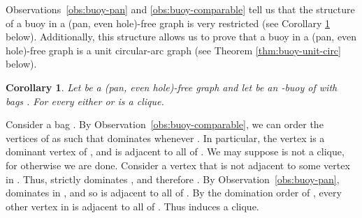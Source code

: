 \documentclass[11pt,a4paper]{article}
\newtheorem{corollary}[theorem]{Corollary}
\newenvironment{proof}{\noindent {\it Proof:~}}{\hfill \smallskip\par}
\begin{document}
Observations~\ref{obs:buoy-pan} and \ref{obs:buoy-comparable} tell
us that the structure of a buoy in a (pan, even hole)-free graph
is very restricted (see Corollary \ref{cor:buoy-clique} below).
Additionally, this structure allows us to prove that a buoy in a
(pan, even hole)-free graph is a unit circular-arc graph (see
Theorem \ref{thm:buoy-unit-circ} below).
\begin{corollary}\label{cor:buoy-clique}
Let  be a (pan, even hole)-free graph and let  be an
-buoy of  with bags . For every
 either  or  is a clique.
\end{corollary}
\begin{proof}
Consider a bag .  By Observation~\ref{obs:buoy-comparable},
we can order the vertices of  as  such that  dominates  whenever .
In particular, the vertex  is a dominant vertex of ,
and  is adjacent to all of . We may
suppose  is not a clique, for otherwise we are
done. Consider a vertex  that is not adjacent to some
vertex  in . Thus,  strictly dominates
, and therefore . By
Observation~\ref{obs:buoy-pan},  dominates  in
, and so  is adjacent to all of . By
the domination order of , every other vertex in  is
adjacent to all of . Thus  induces a
clique.
\end{proof}
\end{document}
